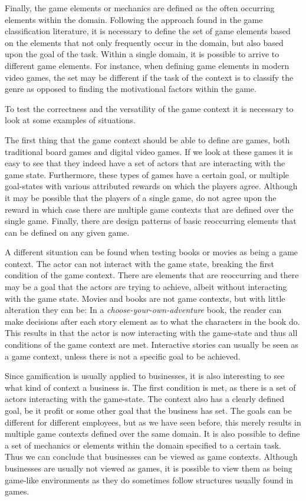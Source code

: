 \documentclass[11pt]{article}
\begin{document}
Finally, the game elements or mechanics are defined as the often occurring elements within the domain. Following the approach found in the game classification literature, it is necessary to define the set of game elements based on the elements that not only frequently occur in the domain, but also based upon the goal of the task. Within a single domain, it is possible to arrive to different game elements. For instance, when defining game elements in modern video games, the set may be different if the task of the context is to classify the genre as opposed to finding the motivational factors within the game.

To test the correctness and the versatility of the game context it is necessary to look at some examples of situations.

The first thing that the game context should be able to define are games, both traditional board games and digital video games. If we look at these games it is easy to see that they indeed have a set of actors that are interacting with the game state. Furthermore, these types of games have a certain goal, or multiple goal-states with various attributed rewards on which the players agree. Although it may be possible that the players of a single game, do not agree upon the reward in which case there are multiple game contexts that are defined over the single game. Finally, there are design patterns of basic reoccurring elements that can be defined on any given game. 

A different situation can be found when testing books or movies as being a game context. The actor can not interact with the game state, breaking the first condition of the game context. There are elements that are reoccurring and there may be a goal that the actors are trying to achieve, albeit without interacting with the game state. Movies and books are not game contexts, but with little alteration they can be: In a \emph{choose-your-own-adventure} book, the reader can make decisions after each story element as to what the characters in the book do. This results in that the actor is now interacting with the game-state and thus all conditions of the game context are met. Interactive stories can usually be seen as a game context, unless there is not a specific goal to be achieved.

Since gamification is usually applied to businesses, it is also interesting to see what kind of context a business is. The first condition is met, as there is a set of actors interacting with the game-state. The context also has a clearly defined goal, be it profit or some other goal that the business has set. The goals can be different for different employees, but as we have seen before, this merely results in multiple game contexts defined over the same domain. It is also possible to define a set of mechanics or elements within the domain specified to a certain task. Thus we can conclude that businesses can be viewed as game contexts. Although businesses are usually not viewed as games, it is possible to view them as being game-like environments as they do sometimes follow structures usually found in games.
\end{document}
